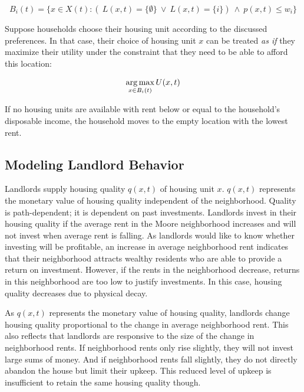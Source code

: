\begin{equation}
B_i(t) = \{x \in X(t): (\ L(x, t) = \{\emptyset\} \ \lor \ L(x, t) = \{i\}) \ \land \ p(x, t) \leq w_i \}
\end{equation}

Suppose households choose their housing unit according to the discussed preferences. In that case, their choice of housing unit $x$ can be treated \textit{as if} they maximize their utility under the constraint that they need to be able to afford this location:

\begin{equation}
\operatorname*{arg\,max}_{x \in B_i(t)} U(x, t) \\*
\end{equation}

If no housing units are available with rent below or equal to the household's disposable income, the household moves to the empty location with the lowest rent. 


\subsection{Modeling Landlord Behavior}

Landlords supply housing quality $q(x, t)$ of housing unit $x$. $q(x, t)$ represents the monetary value of housing quality independent of the neighborhood. Quality is path-dependent; it is dependent on past investments. Landlords invest in their housing quality if the average rent in the Moore neighborhood increases and will not invest when average rent is falling. As landlords would like to know whether investing will be profitable, an increase in average neighborhood rent indicates that their neighborhood attracts wealthy residents who are able to provide a return on investment. However, if the rents in the neighborhood decrease, returns in this neighborhood are too low to justify investments. In this case, housing quality decreases due to physical decay. 

As $q(x, t)$ represents the monetary value of housing quality, landlords change housing quality proportional to the change in average neighborhood rent. This also reflects that landlords are responsive to the size of the change in neighborhood rents. If neighborhood rents only rise slightly, they will not invest large sums of money. And if neighborhood rents fall slightly, they do not directly abandon the house but limit their upkeep. This reduced level of upkeep is insufficient to retain the same housing quality though.

